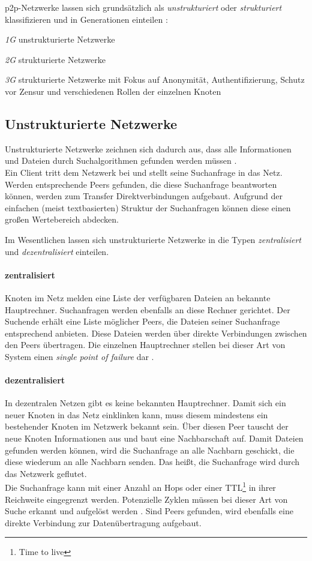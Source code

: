 p2p-Netzwerke lassen sich grundsätzlich als \emph{unstrukturiert} oder \emph{strukturiert} klassifizieren \cite{Steinmetz2005, Lua2005Survey} und in Generationen einteilen \cite{Bo2003PeertoPeer}:
\begin{itemize*}
	\item \emph{1G} unstrukturierte Netzwerke
	\item \emph{2G} strukturierte Netzwerke
	\item \emph{3G} strukturierte Netzwerke mit Fokus auf Anonymität, Authentifizierung, Schutz vor Zensur und verschiedenen Rollen der einzelnen Knoten
\end{itemize*}

\subsection{Unstrukturierte Netzwerke}
Unstrukturierte Netzwerke zeichnen sich dadurch aus, dass alle Informationen und Dateien durch Suchalgorithmen gefunden werden müssen \cite{Lv2002}. \\
Ein Client tritt dem Netzwerk bei und stellt seine Suchanfrage in das Netz. Werden entsprechende Peers gefunden, die diese Suchanfrage beantworten können, werden zum Transfer Direktverbindungen aufgebaut. Aufgrund der einfachen (meist textbasierten) Struktur der Suchanfragen können diese einen großen Wertebereich abdecken.

Im Wesentlichen lassen sich unstrukturierte Netzwerke in die Typen \emph{zentralisiert} und \emph{dezentralisiert} einteilen.

\paragraph{zentralisiert} Knoten im Netz melden eine Liste der verfügbaren Dateien an bekannte Hauptrechner. Suchanfragen werden ebenfalls an diese Rechner gerichtet. Der Suchende erhält eine Liste möglicher Peers, die Dateien seiner Suchanfrage entsprechend anbieten. Diese Dateien werden über direkte Verbindungen zwischen den Peers übertragen. Die einzelnen Hauptrechner stellen bei dieser Art von System einen \emph{single point of failure} dar \cite{Eberspaecher2005}.

\paragraph{dezentralisiert} In dezentralen Netzen gibt es keine bekannten Hauptrechner. Damit sich ein neuer Knoten in das Netz einklinken kann, muss diesem mindestens ein bestehender Knoten im Netzwerk bekannt sein. Über diesen Peer tauscht der neue Knoten Informationen aus und baut eine Nachbarschaft auf. Damit Dateien gefunden werden können, wird die Suchanfrage an alle Nachbarn geschickt, die diese wiederum an alle Nachbarn senden. Das heißt, die Suchanfrage wird durch das Netzwerk geflutet.\\
Die Suchanfrage kann mit einer Anzahl an Hops oder einer TTL\footnote{Time to live} in ihrer Reichweite eingegrenzt werden. Potenzielle Zyklen müssen bei dieser Art von Suche erkannt und aufgelöst werden \cite{Lv2002}. Sind Peers gefunden, wird ebenfalls eine direkte Verbindung zur Datenübertragung aufgebaut. 

